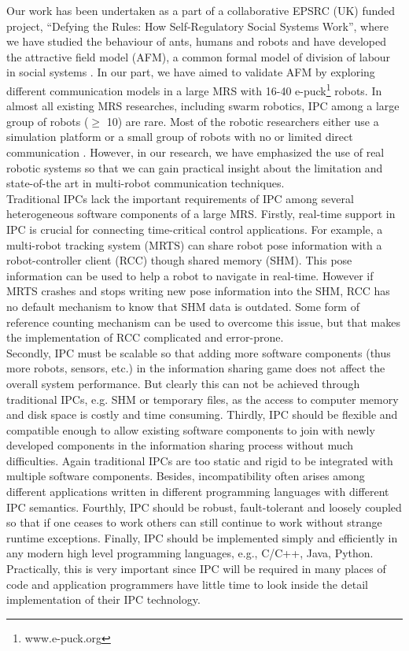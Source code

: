 \documentclass[draft]{ifacconf}
\begin{document}
Our work has been undertaken as a part of a collaborative EPSRC (UK) funded project, ``Defying the Rules: How Self-Regulatory Social Systems Work'', where we have studied the behaviour of ants, humans and robots and have developed the attractive field model (AFM), a common formal model of division of labour in social systems \citep{Arcaute+2008}. In our part, we have aimed to validate AFM by exploring different communication models in a large MRS with 16-40 e-puck\footnote{www.e-puck.org} robots. In almost all existing MRS researches, including swarm robotics, IPC among a large group of robots ($\geq$ 10) are rare. Most of the robotic researchers either use a simulation platform or a small group of robots with no or limited direct communication \citep[e.g. ][]{Labella2007}.   However, in our research, we have emphasized the use of real robotic systems so that we can gain practical insight about the limitation and state-of-the art in multi-robot communication techniques.\\
Traditional IPCs lack the important requirements of IPC among several heterogeneous software components of a large MRS. Firstly, real-time support in IPC is crucial for connecting time-critical control applications. For example, a multi-robot tracking system (MRTS) can share robot pose information with a robot-controller client (RCC) though shared memory (SHM). This pose information can be used to help  a robot to navigate in real-time. However if MRTS crashes and stops writing new pose information into the SHM, RCC has no default mechanism to know that SHM data is outdated. Some form of reference counting mechanism can be used to overcome this issue, but that makes the implementation of RCC complicated and error-prone.\\
Secondly, IPC must be scalable so that adding more software components (thus more robots, sensors, etc.) in the information sharing game does not affect the overall system performance. But clearly this can not be achieved through traditional IPCs, e.g. SHM or temporary files,  as the access to computer memory and disk space is costly and time consuming. Thirdly, IPC should be flexible and compatible enough to allow existing software components to join with newly developed components in the information  sharing process without much difficulties. Again traditional IPCs are too static and rigid to be integrated with multiple software components. Besides, incompatibility often arises among different applications written in different programming languages with different  IPC semantics. Fourthly, IPC should be robust, fault-tolerant and loosely coupled so that if one ceases to work others can still continue to work without strange runtime exceptions. Finally, IPC should be implemented simply and efficiently in any modern high level programming languages, e.g., C/C++, Java, Python. Practically, this is very important since IPC will be required in many places of code and application programmers have little time to look inside the detail implementation of their IPC technology.\\
\end{document}
